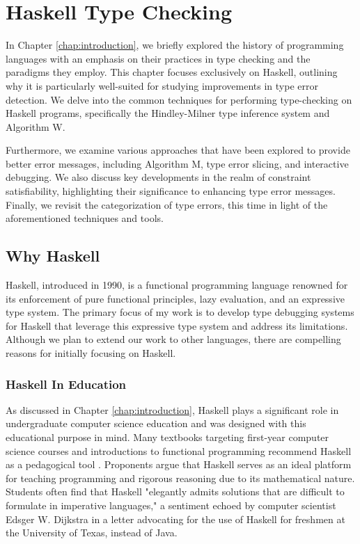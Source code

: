 
\chapter{Haskell Type Checking} %

\label{chap:haskell-type-checking}

\graphicspath{{Figures/HaskellTypeChecking}}

In Chapter \ref{chap:introduction}, we briefly explored the history of programming languages with an emphasis on their practices in type checking and the paradigms they employ. This chapter focuses exclusively on Haskell, outlining why it is particularly well-suited for studying improvements in type error detection. We delve into the common techniques for performing type-checking on Haskell programs, specifically the Hindley-Milner type inference system and Algorithm W.

Furthermore, we examine various approaches that have been explored to provide better error messages, including Algorithm M, type error slicing, and interactive debugging. We also discuss key developments in the realm of constraint satisfiability, highlighting their significance to enhancing type error messages. Finally, we revisit the categorization of type errors, this time in light of the aforementioned techniques and tools.

\section{Why Haskell}

Haskell, introduced in 1990, is a functional programming language renowned for its enforcement of pure functional principles, lazy evaluation, and an expressive type system. The primary focus of my work is to develop type debugging systems for Haskell that leverage this expressive type system and address its limitations. Although we plan to extend our work to other languages, there are compelling reasons for initially focusing on Haskell.

\subsection{Haskell In Education}
As discussed in Chapter \ref{chap:introduction}, Haskell plays a significant role in undergraduate computer science education and was designed with this educational purpose in mind. Many textbooks targeting first-year computer science courses and introductions to functional programming recommend Haskell as a pedagogical tool \cite{Bird1998-kv, Davie1992-xv}. Proponents argue that Haskell serves as an ideal platform for teaching programming and rigorous reasoning due to its mathematical nature. Students often find that Haskell "elegantly admits solutions that are difficult to formulate in imperative languages," a sentiment echoed by computer scientist Edsger W. Dijkstra in a letter advocating for the use of Haskell for freshmen at the University of Texas, instead of Java.

